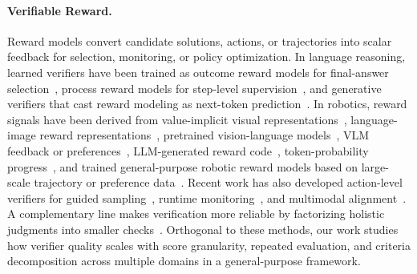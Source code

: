 \paragraph{Verifiable Reward.}
Reward models convert candidate solutions, actions, or trajectories into scalar feedback for selection, monitoring, or policy optimization. In language reasoning, learned verifiers have been trained as outcome reward models for final-answer selection~\citep{cobbe_training_2021}, process reward models for step-level supervision~\citep{uesato2022solving,lightman_lets_2023}, and generative verifiers that cast reward modeling as next-token prediction~\citep{zhang2025generativeverifiersrewardmodeling}. 
In robotics, reward signals have been derived from value-implicit visual representations~\citep{ma2022vip}, language-image reward representations~\citep{ma2023liv}, pretrained vision-language models~\citep{sontakke2023roboclip,rocamonde2023vlmrm,ICLR2025_54854cf1}, VLM feedback or preferences~\citep{wang2024rlvlmf}, LLM-generated reward code~\citep{yu2023languagetorewards,xie2023text2reward,ma2023eureka}, token-probability progress~\citep{chen2026topreward}, and trained general-purpose robotic reward models based on large-scale trajectory or preference data~\citep{zhang2025rewind,chen2025sarm,lee2026roboreward,liang2026robometer}.
Recent work has also developed action-level verifiers for guided sampling~\citep{nakamoto2024steering,liu2024bidirectional,kwok2025robomonkey}, runtime monitoring~\citep{agia2024unpacking}, and multimodal alignment~\citep{kwok2026scalingverificationeffectivescaling}.
A complementary line makes verification more reliable by factorizing holistic judgments into smaller checks~\citep{min2023factscore,fabbri2021qafacteval,manakul2023selfcheckgpt,liu2024hdeval,liu2026worldactionverifierselfimproving,tseng2026sc3}. Orthogonal to these methods, our work studies how verifier quality scales with score granularity, repeated evaluation, and criteria decomposition across multiple domains in a general-purpose framework.



